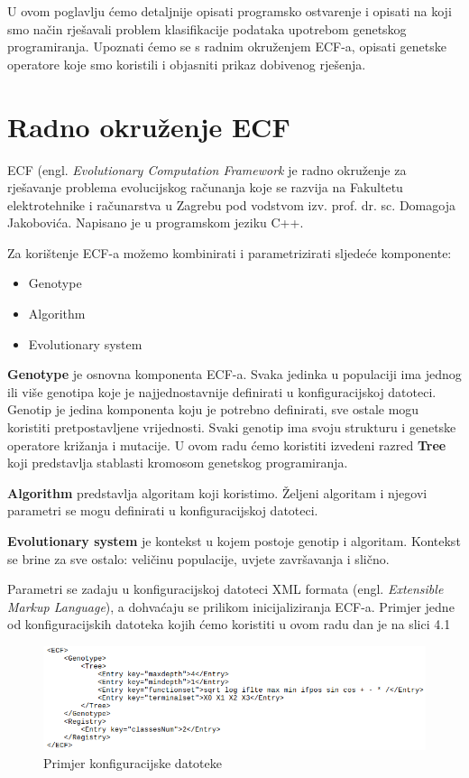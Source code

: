 \documentclass[times, utf8, zavrsni]{fer}
\begin{document}
U ovom poglavlju ćemo detaljnije opisati programsko ostvarenje i opisati na koji smo način rješavali problem klasifikacije podataka upotrebom genetskog programiranja. Upoznati ćemo se s radnim okruženjem ECF-a, opisati genetske operatore koje smo koristili i objasniti prikaz dobivenog rješenja.

\section{Radno okruženje ECF}

ECF (engl. \textit{Evolutionary Computation Framework} je radno okruženje za rješavanje problema evolucijskog računanja koje se razvija na Fakultetu elektrotehnike i računarstva u Zagrebu pod vodstvom izv. prof. dr. sc. Domagoja Jakobovića. Napisano je u programskom jeziku C++. 

Za korištenje ECF-a možemo kombinirati i parametrizirati sljedeće komponente:

\begin{itemize}
\item Genotype
\item Algorithm
\item Evolutionary system
\end{itemize}

\textbf{Genotype} je osnovna komponenta ECF-a. Svaka jedinka u populaciji ima jednog ili više genotipa koje je najjednostavnije definirati u konfiguracijskoj datoteci. Genotip je jedina komponenta koju je potrebno definirati, sve ostale mogu koristiti pretpostavljene vrijednosti. Svaki genotip ima svoju strukturu i genetske operatore križanja i mutacije. U ovom radu ćemo koristiti izvedeni razred \textbf{Tree} koji predstavlja stablasti kromosom genetskog programiranja.

\textbf{Algorithm} predstavlja algoritam koji koristimo. Željeni algoritam i njegovi parametri se mogu definirati u konfiguracijskoj datoteci.

\textbf{Evolutionary system} je kontekst u kojem postoje genotip i algoritam. Kontekst se brine za sve ostalo: veličinu populacije, uvjete završavanja i slično. 

Parametri se zadaju u konfiguracijskoj datoteci XML formata (engl. \textit{Extensible Markup Language}), a dohvaćaju se prilikom inicijaliziranja ECF-a. Primjer jedne od konfiguracijskih datoteka kojih ćemo koristiti u ovom radu dan je na slici 4.1

\begin{figure}[htb]
\centering
\includegraphics[scale=0.6]{images/xml}
\caption{Primjer konfiguracijske datoteke}
\end{figure}
\end{document}
